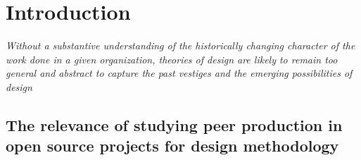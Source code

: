 \documentclass{ICED-Paper}%
\begin{document}

\section{Introduction}

\emph{Without a substantive understanding of the historically changing character of the work done in a given organization, theories of design are likely to remain too general and abstract to capture the past vestiges and the emerging possibilities of design}\cite{ExpansiveDesign}

\subsection{The relevance of studying peer production in open source projects for design methodology}
\end{document}
